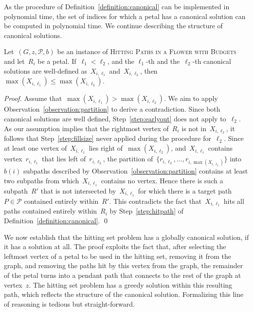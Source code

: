 \let\accentvec\vec  \documentclass{llncs}
\renewcommand{\P}{\ensuremath{\mathcal{P}}\xspace}
\newcommand{\HitPathsInFlower}{\textsc{Hitting Paths in a Flower with Budgets}\xspace}
\begin{document}
As the procedure of Definition~\ref{definition:canonical} can be implemented in polynomial time, the set of indices for which a petal has a canonical solution can be computed in polynomial time. We continue describing the structure of canonical solutions.

\begin{lemma} \label{lemma:latersolutionsreachfurther}
Let~$(G,z,\P,b)$ be an instance of \HitPathsInFlower and let~$R_i$ be a petal. If~$\ell_1 < \ell_2$, and the $\ell_1$-th and the~$\ell_2$-th canonical solutions are well-defined as~$X_{i,\ell_1}$ and~$X_{i,\ell_2}$, then~$\max(X_{i,\ell_1}) \leq \max(X_{i,\ell_2})$.
\end{lemma}
\begin{proof}
Assume that~$\max(X_{i,\ell_1}) > \max(X_{i,\ell_2})$. We aim to apply Observation~\ref{observation:partition} to derive a contradiction. Since both canonical solutions are well defined, Step~\ref{step:earlyout} does not apply to~$\ell_2$. As our assumption implies that the rightmost vertex of~$R_i$ is not in~$X_{i,\ell_2}$, it follows that Step~\ref{step:fillsize} never applied during the procedure for~$\ell_2$. Since at least one vertex of~$X_{i,\ell_1}$ lies right of~$\max(X_{i,\ell_2})$, and~$X_{i,\ell_1}$ contains vertex~$r_{i,\ell_1}$ that lies left of~$r_{i,\ell_2}$, the partition of~$\{r_{i,\ell_2}, \ldots, r_{i,\max(X_{i,\ell_2})}\}$ into~$b(i)$ subpaths described by Observation~\ref{observation:partition} contains at least two subpaths from which~$X_{i,\ell_1}$ contains no vertex. Hence there is such a subpath~$R'$ that is not intersected by~$X_{i,\ell_1}$ for which there is a target path~$P \in \P$ contained entirely within~$R'$. This contradicts the fact that~$X_{i,\ell_1}$ hits all paths contained entirely within~$R_i$ by Step~\ref{step:hitpath} of Definition~\ref{definition:canonical}.
\qed
\end{proof}

We now establish that the hitting set problem has a globally canonical solution, if it has a solution at all. The proof exploits the fact that, after selecting the leftmost vertex of a petal to be used in the hitting set, removing it from the graph, and removing the paths hit by this vertex from the graph, the remainder of the petal turns into a pendant path that connects to the rest of the graph at vertex~$z$. The hitting set problem has a greedy solution within this resulting path, which reflects the structure of the canonical solution. Formalizing this line of reasoning is tedious but straight-forward.
\end{document}
